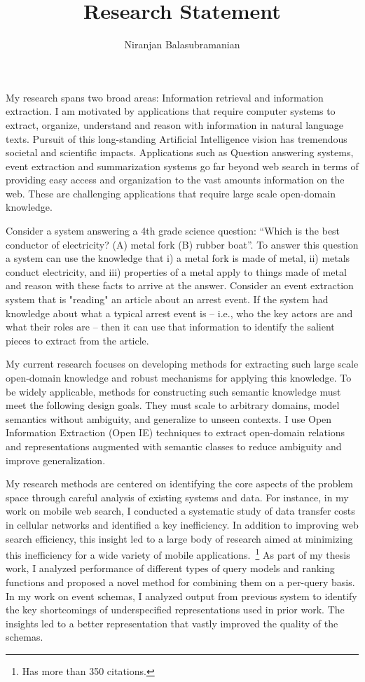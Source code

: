 \documentclass[a4paper,11pt,onecolumn]{article}
\begin{document}

\title{Research Statement}
\author{Niranjan Balasubramanian}
\maketitle

My research spans two broad areas: Information retrieval and information extraction. I am motivated by applications that require computer systems to extract, organize, understand and reason with information in natural language texts. Pursuit of this long-standing Artificial Intelligence vision has tremendous societal and scientific impacts. Applications such as Question answering systems, event extraction and summarization systems go far beyond web search in terms of providing easy access and organization to the vast amounts information on the web. These are challenging applications that require large scale open-domain knowledge. 

Consider a system answering a 4th grade science question:  ``Which is the best conductor of electricity? (A) metal fork (B) rubber boat''. To answer this question a system can use the knowledge that i) a metal fork is made of metal, ii) metals conduct electricity, and iii) properties of a metal apply to things made of metal and reason with these facts to arrive at the answer. Consider an event extraction system that is "reading" an article about an arrest event. If the system had knowledge about what a typical arrest event is -- i.e., who the key actors are and what their roles are -- then it can use that information to identify the salient pieces to extract from the article. 

My current research focuses on developing methods for extracting such large scale open-domain knowledge and robust mechanisms for applying this knowledge. To be widely applicable, methods for constructing such semantic knowledge must meet the following design goals. They must scale to arbitrary domains, model semantics without ambiguity, and generalize to unseen contexts. I use Open Information Extraction (Open IE) techniques to extract open-domain relations and representations augmented with semantic classes to reduce ambiguity and improve generalization.

My research methods are centered on identifying the core aspects of the problem space through careful analysis of existing systems and data. For instance, in my work on mobile web search, I conducted a systematic study of data transfer costs in cellular networks and identified a key inefficiency. In addition to improving web search efficiency, this insight led to a large body of research aimed at minimizing this inefficiency for a wide variety of mobile applications.~\footnote{Has more than 350 citations.} As part of my thesis work, I analyzed performance of different types of query models and ranking functions and proposed a novel method for combining them on a per-query basis. In my work on event schemas, I analyzed output from previous system to identify the key shortcomings of underspecified representations used in prior work. The insights led to a better representation that vastly improved the quality of the schemas. 
\end{document}
